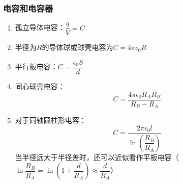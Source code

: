\subsubsection{电容和电容器}
\begin{enumerate}
	\item 孤立导体电容：$ \dfrac{q}{V}=C $
	\item 半径为$ R $的导体球或球壳电容为$ C=4\pi \epsilon_0 R $
	\item 平行板电容：$ C=\dfrac{\epsilon_0S}{d} $
	\item 同心球壳电容：
	\begin{equation}\label{key}
		C=\dfrac{4\pi \epsilon_0R_AR_B}{R_B-R_A}
	\end{equation}
\item 对于同轴圆柱形电容：
\begin{equation}\label{key}
	C=\dfrac{2\pi \epsilon_0l}{\ln (\dfrac{R_B}{R_A})}
\end{equation}
当半径远大于半径差时，还可以近似看作平板电容（$ \ln \dfrac{R_B}{R_A}=\ln (1+\dfrac{d}{R_A})\approx \dfrac{d}{R_A} $）
\end{enumerate}

